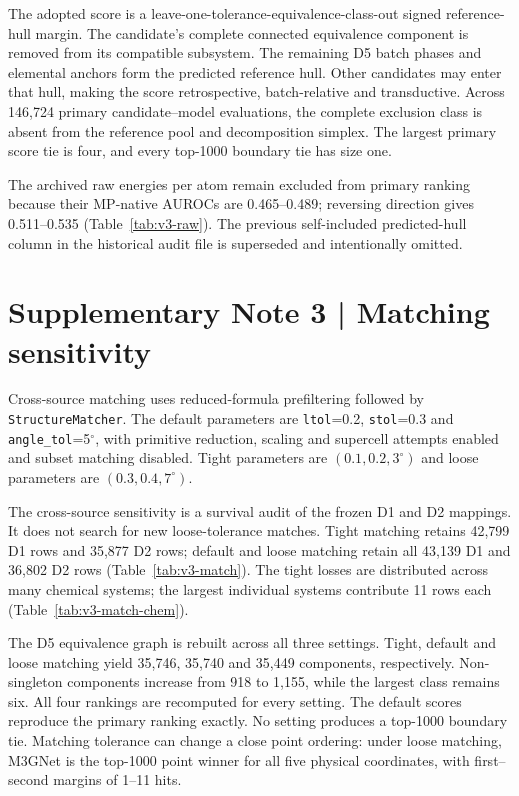 \documentclass[a4paper,10pt]{article}
\begin{document}
The adopted score is a leave-one-tolerance-equivalence-class-out signed reference-hull margin. The candidate's complete connected equivalence component is removed from its compatible subsystem. The remaining D5 batch phases and elemental anchors form the predicted reference hull. Other candidates may enter that hull, making the score retrospective, batch-relative and transductive. Across 146,724 primary candidate--model evaluations, the complete exclusion class is absent from the reference pool and decomposition simplex. The largest primary score tie is four, and every top-1000 boundary tie has size one.

The archived raw energies per atom remain excluded from primary ranking because their MP-native AUROCs are 0.465--0.489; reversing direction gives 0.511--0.535 (Table~\ref{tab:v3-raw}). The previous self-included predicted-hull column in the historical audit file is superseded and intentionally omitted.

\section*{Supplementary Note 3 | Matching sensitivity}
Cross-source matching uses reduced-formula prefiltering followed by \texttt{StructureMatcher}. The default parameters are \texttt{ltol}=0.2, \texttt{stol}=0.3 and \texttt{angle\_tol}=5$^\circ$, with primitive reduction, scaling and supercell attempts enabled and subset matching disabled. Tight parameters are $(0.1,0.2,3^\circ)$ and loose parameters are $(0.3,0.4,7^\circ)$.

The cross-source sensitivity is a survival audit of the frozen D1 and D2 mappings. It does not search for new loose-tolerance matches. Tight matching retains 42,799 D1 rows and 35,877 D2 rows; default and loose matching retain all 43,139 D1 and 36,802 D2 rows (Table~\ref{tab:v3-match}). The tight losses are distributed across many chemical systems; the largest individual systems contribute 11 rows each (Table~\ref{tab:v3-match-chem}).

The D5 equivalence graph is rebuilt across all three settings. Tight, default and loose matching yield 35,746, 35,740 and 35,449 components, respectively. Non-singleton components increase from 918 to 1,155, while the largest class remains six. All four rankings are recomputed for every setting. The default scores reproduce the primary ranking exactly. No setting produces a top-1000 boundary tie. Matching tolerance can change a close point ordering: under loose matching, M3GNet is the top-1000 point winner for all five physical coordinates, with first--second margins of 1--11 hits.
\end{document}
